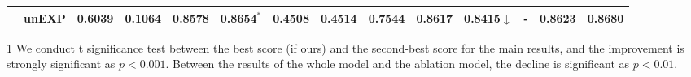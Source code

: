 \begin{table}[h]
{\begin{threeparttable}[b]
\begin{tabular}{c|c|ccccccc|c|cccc}
      \cline{2-14}
      & unEXP & 0.6039 & 0.1064 & 0.8578 & \textbf{0.8654}$^*$ & 0.4508 & 0.4514 & 0.7544 & 0.8617 & 0.8415$\downarrow$ & - & 0.8623&0.8680\\ 
      \bottomrule
    \end{tabular}
  \begin{tablenotes}
    \item[1] We conduct t significance test between the best score (if ours) and the second-best score for the main results, and the improvement is strongly significant as $p<0.001$. Between the results of the whole model and the ablation model, the decline is significant as $p<0.01$.
  \end{tablenotes}
  \end{threeparttable}
    }
\end{table}


